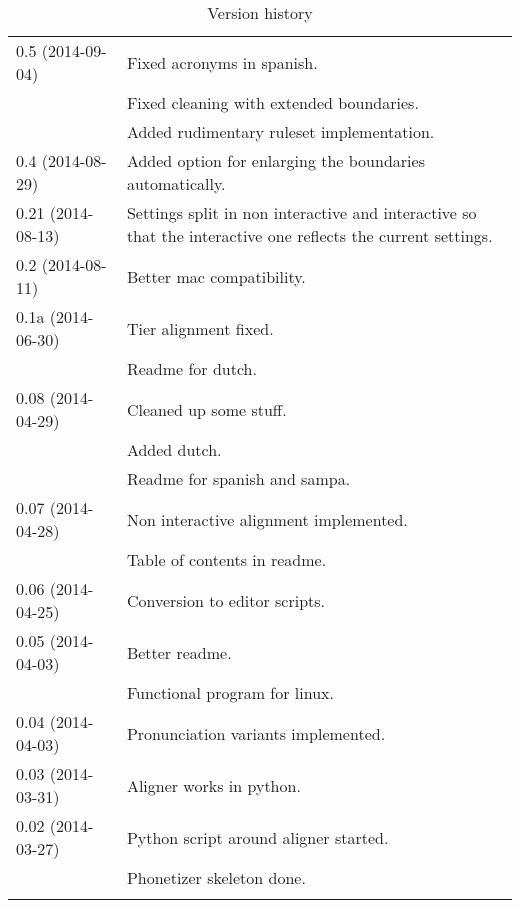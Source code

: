 \begin{longtable}{|p{0.22\linewidth}p{0.8\linewidth}|}
	\hline
	0.5 (2014-09-04) & \tabitem Fixed acronyms in spanish.\\
		& \tabitem Fixed cleaning with extended boundaries.\\
		& \tabitem Added rudimentary ruleset implementation.\\
	\hline
	0.4 (2014-08-29) & \tabitem Added option for enlarging the boundaries
automatically.\\
	\hline
	0.21 (2014-08-13) & \tabitem Settings split in non interactive and
interactive so that the interactive one reflects the current settings.\\
	\hline
	0.2 (2014-08-11) & \tabitem Better mac compatibility.\\
	\hline
	0.1a (2014-06-30) & \tabitem Tier alignment fixed.\\
		& \tabitem Readme for dutch.\\
	\hline
	0.08 (2014-04-29) & \tabitem Cleaned up some stuff.\\
		& \tabitem Added dutch.\\
		& \tabitem Readme for spanish and sampa.\\
	\hline
	0.07 (2014-04-28) & \tabitem Non interactive alignment implemented.\\
		& \tabitem Table of contents in readme.\\
	\hline
	0.06 (2014-04-25) & \tabitem Conversion to editor scripts.\\
	\hline
	0.05 (2014-04-03) & \tabitem Better readme.\\
		& \tabitem Functional program for linux.\\
	\hline
	0.04 (2014-04-03) & \tabitem Pronunciation variants implemented.\\
	\hline
	0.03 (2014-03-31) & \tabitem Aligner works in python.\\
	\hline
	0.02 (2014-03-27) & \tabitem Python script around aligner started.\\
		& \tabitem Phonetizer skeleton done.\\
	\hline
	\caption{Version history}
\end{longtable}



